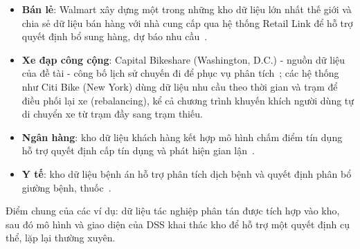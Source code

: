 \label{sec:theory-examples}
\begin{itemize}
    \item \textbf{Bán lẻ}: Walmart xây dựng một trong những kho dữ liệu lớn nhất thế giới và chia sẻ dữ liệu bán hàng với nhà cung cấp qua hệ thống Retail Link để hỗ trợ quyết định bổ sung hàng, dự báo nhu cầu~\cite{sharda}.
    \item \textbf{Xe đạp công cộng}: Capital Bikeshare (Washington, D.C.) - nguồn dữ liệu của đề tài - công bố lịch sử chuyến đi để phục vụ phân tích~\cite{fanaee}; các hệ thống như Citi Bike (New York) dùng dữ liệu nhu cầu theo thời gian và trạm để điều phối lại xe (rebalancing), kể cả chương trình khuyến khích người dùng tự di chuyển xe từ trạm đầy sang trạm thiếu.
    \item \textbf{Ngân hàng}: kho dữ liệu khách hàng kết hợp mô hình chấm điểm tín dụng hỗ trợ quyết định cấp tín dụng và phát hiện gian lận~\cite{sharda}.
    \item \textbf{Y tế}: kho dữ liệu bệnh án hỗ trợ phân tích dịch bệnh và quyết định phân bổ giường bệnh, thuốc~\cite{burstein}.
\end{itemize}
Điểm chung của các ví dụ: dữ liệu tác nghiệp phân tán được tích hợp vào kho, sau đó mô hình và giao diện của DSS khai thác kho để hỗ trợ một quyết định cụ thể, lặp lại thường xuyên.
